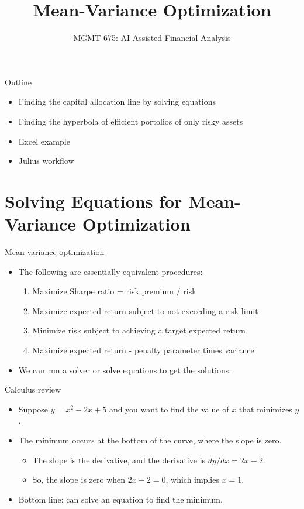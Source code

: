 \documentclass[10pt]{beamer}
\title{Mean-Variance Optimization}
\subtitle{MGMT 675: AI-Assisted Financial Analysis}
\date{}
\begin{document}
\begin{frame}[plain]
\titlepage
\end{frame}
\begin{frame}{Outline}
\begin{itemize}
\item Finding the capital allocation line by solving equations
\item Finding the hyperbola of efficient portolios of only risky assets
\item Excel example 
\item Julius workflow
\end{itemize}
\end{frame}


\section{Solving Equations for Mean-Variance Optimization}

\begin{frame}{Mean-variance optimization}
\begin{itemize}
\item The following are essentially equivalent procedures:
\begin{enumerate}
\item Maximize Sharpe ratio = risk premium / risk
\item Maximize expected return subject to not exceeding a risk limit 
\item Minimize risk subject to achieving a target expected return
\item Maximize expected return - penalty parameter times variance
\end{enumerate}
\item We can run a solver or solve equations to get the solutions.
\end{itemize}
\end{frame}

\begin{frame}{Calculus review}
\begin{itemize}
\item Suppose $y = x^2 - 2x + 5$ and you want to find the value of $x$ that minimizes $y$.
\item The minimum occurs at the bottom of the curve, where the slope is zero.
  \begin{itemize}
  \item The slope is the derivative, and the derivative is $d y/d x = 2x - 2$.
  \item So, the slope is zero when $2x-2=0$, which implies $x=1$.
  \end{itemize}
\item Bottom line: can solve an equation to find the minimum.
\end{itemize}
\end{frame}
\end{document}
